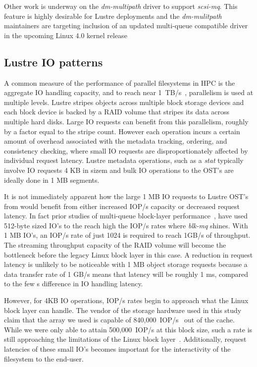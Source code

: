 \documentclass[conference]{IEEEtran}
\begin{document}
Other work is underway on the \emph{dm-multipath} driver to support \emph{scsi-mq}. This feature is highly desirable for Lustre deployments and the
\emph{dm-mulitpath} maintainers are targeting inclusion of an updated multi-queue compatible driver in the upcoming Linux 4.0 kernel release

\subsection{Lustre IO patterns}
\label{sec:lustre-io}
A common measure of the performance of parallel filesystems in HPC is the
aggregate IO handling capacity, and to reach near 1~TB/s~\cite{sc14-spider}, parallelism is used at multiple levels.
Lustre stripes objects across multiple block storage devices \cite{www:lustre}
and each block device is backed by a RAID volume that stripes its data across multiple
hard disks. Large IO requests can benefit from this parallelism, roughly by a
factor equal to the stripe count. However each
operation incurs a certain amount of overhead associated with the metadata
tracking, ordering, and consistency checking, where small IO requests are
disproportionately affected by individual request latency. Lustre metadata operations,
such as a \emph{stat} typically involve IO requests 4 KB in sizem
and bulk IO operations to the OST's are ideally done
in 1 MB segments.

It is not immediately apparent how the large 1 MB IO requests to Lustre OST's 
from would benefit from either increased IOP/s capacity or decreased request
latency. In fact prior studies of multi-queue block-layer performance~\cite{bjorling13, www:scsimq:v2}, have used
512-byte sized IO's to the reach high the IOP/s rates where \emph{blk-mq} shines. With 1 MB IO's, an IOP/s rate of just 1024
is required to reach 1GB/s of throughput. The streaming throughput capacity of the RAID volume will become the bottleneck before the 
legacy Linux block layer in this case. A reduction in request latency is unlikely to be noticeable
with 1 MB object storage requests because a data transfer rate of 1 GB/s means that latency will be roughly 1 ms, compared
to the few s difference in IO handling latency.

However, for 4KB IO operations, IOP/s rates begin to approach what the Linux block
layer can handle. The vendor of the storage
hardware used in this study claim that the array we used is capable of 840,000~IOP/s~\cite{ddn10k} out of the cache.
While we were only able to attain 500,000~IOP/s at this block size,
such a rate is still approaching the limitations of the Linux block layer~\cite{bjorling13}. Additionally, request latencies of
these small IO's becomes important for the interactivity of the filesystem to the end-user.
\end{document}
